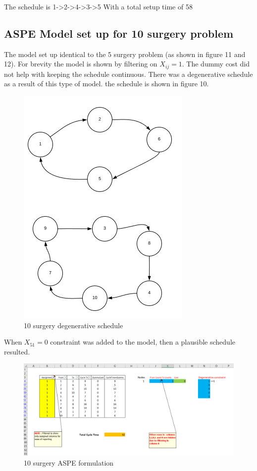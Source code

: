 \documentclass[]{article}
\begin{document}
The schedule is
1-\textgreater{}2-\textgreater{}4-\textgreater{}3-\textgreater{}5 With a
total setup time of 58

\subsection{ASPE Model set up for 10 surgery
problem}\label{aspe-model-set-up-for-10-surgery-problem}

The model set up identical to the 5 surgery problem (as shown in figure
11 and 12). For brevity the model is shown by filtering on
\(X_{ij} = 1\). The dummy cost did not help with keeping the schedule
continuous. There was a degenerative schedule as a result of this type
of model. the schedule is shown in figure 10.

\begin{figure}
\centering
\includegraphics[height=0.50000\textwidth]{Figures/Homework3/p3bsnW.PNG}
\caption{10 surgery degenerative schedule}
\end{figure}

When \(X_{51} = 0\) constraint was added to the model, then a plausible
schedule resulted.

\begin{figure}
\centering
\includegraphics[height=0.50000\textwidth]{Figures/Homework3/p3b.PNG}
\caption{10 surgery ASPE formulation}
\end{figure}
\end{document}
